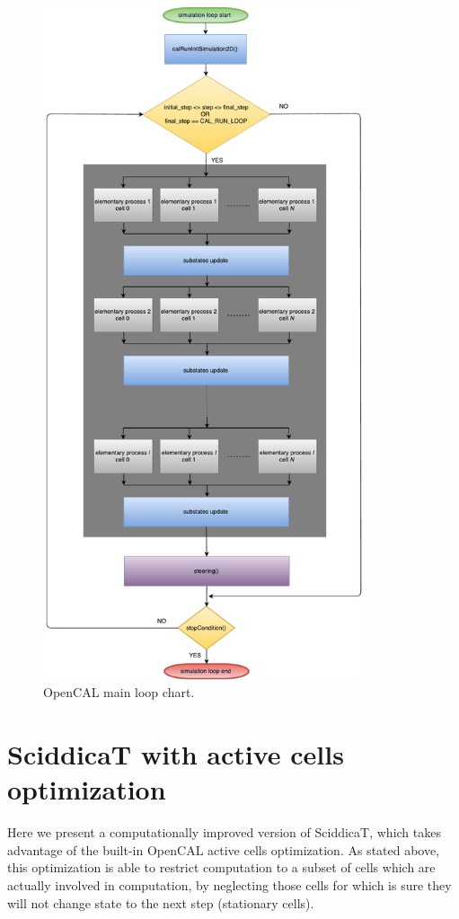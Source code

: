 \begin{figure}[htbp]
  \centering
  \includegraphics[width=9.5cm]{./images/OpenCAL/opencal_main_loop.pdf}
  \caption{OpenCAL main loop chart.}
  \label{fig:opencal_main_loop}
\end{figure}


\section{SciddicaT with active cells optimization}
Here we present a computationally improved version of SciddicaT, which
takes advantage of the built-in OpenCAL active cells optimization. As
stated above, this optimization is able to restrict computation to a
subset of cells which are actually involved in computation, by
neglecting those cells for which is sure they will not change state to
the next step (stationary cells).

